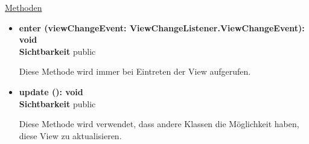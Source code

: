 \underline{Methoden}
\begin{itemize}
\itemsep0pt
\item \textbf{enter (viewChangeEvent: ViewChangeListener.ViewChangeEvent): void}\hfill\\
\textbf{Sichtbarkeit} public

Diese Methode wird immer bei Eintreten der View aufgerufen.

\item \textbf{update (): void}\hfill\\
\textbf{Sichtbarkeit} public

Diese Methode wird verwendet, dass andere Klassen die Möglichkeit haben, diese View zu aktualisieren.

\end{itemize}
